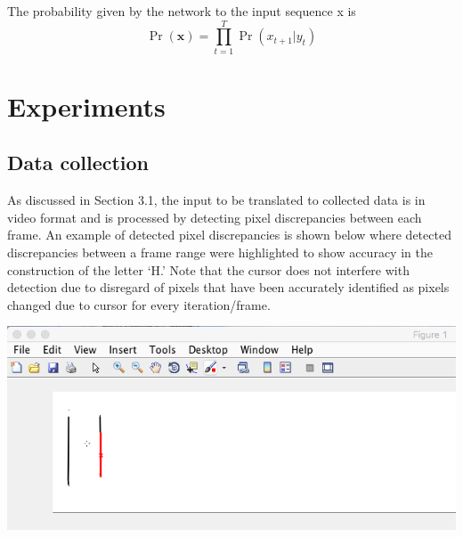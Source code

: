 \documentclass{article} %
\begin{document}
The probability given by the network to the input sequence x is
\begin{equation}
\Pr(\mathbf{x}) = \prod_{t=1}^T{\Pr(x_{t+1}|y_t)}
\end{equation}



\section{Experiments}
\subsection{Data collection}

As discussed in Section 3.1, the input to be translated to collected data is in video format and is processed by detecting pixel discrepancies between each frame. An example of detected pixel discrepancies is shown below where detected discrepancies between a frame range were highlighted to show accuracy in the construction of the letter ‘H.’ Note that the cursor does not interfere with detection due to disregard of pixels that have been accurately identified as pixels changed due to cursor for every iteration/frame.
\begin{center}
\includegraphics[scale = 0.4]{detection_data.png}
\end{center}
\end{document}
